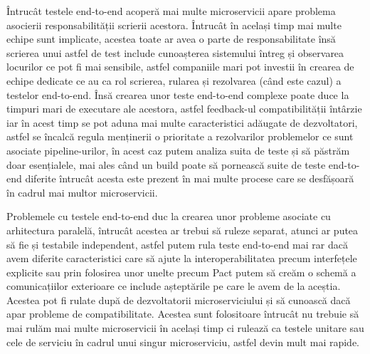 Întrucât testele end-to-end acoperă mai multe microservicii apare problema asocierii 
responsabilității scrierii acestora. Întrucât în același timp mai multe echipe sunt implicate,
acestea toate ar avea o parte de responsabilitate însă scrierea unui astfel de test 
include cunoașterea sistemului întreg și observarea locurilor ce pot fi mai sensibile,
astfel companiile mari pot investii în crearea de echipe dedicate ce au ca rol scrierea, 
rularea și rezolvarea (când este cazul) a testelor end-to-end. Însă crearea unor teste
end-to-end complexe poate duce la timpuri mari de executare ale acestora, astfel 
feedback-ul compatibilității întârzie iar în acest timp se pot aduna mai multe caracteristici
adăugate de dezvoltatori, astfel se încalcă regula menținerii o prioritate a rezolvarilor
problemelor ce sunt asociate pipeline-urilor, în acest caz putem analiza suita de teste și să
păstrăm doar esențialele, mai ales când un build poate să pornească suite de teste end-to-end diferite
întrucât acesta este prezent în mai multe procese care se desfășoară în cadrul mai multor
microservicii.

Problemele cu testele end-to-end duc la crearea unor probleme asociate cu arhitectura paralelă,
întrucât acestea ar trebui să ruleze separat, atunci ar putea să fie și testabile independent,
astfel putem rula teste end-to-end mai rar dacă avem diferite caracteristici care să 
ajute la interoperabilitatea precum interfețele explicite sau prin folosirea unor unelte precum Pact 
putem să creăm o schemă a comunicațiilor exterioare ce include așteptările pe care le avem de la 
aceștia. Acestea pot fi rulate după de dezvoltatorii microserviciului și să cunoască 
dacă apar probleme de compatibilitate. Acestea sunt folositoare întrucât nu trebuie să mai rulăm
mai multe microservicii în același timp ci rulează ca testele unitare sau cele de serviciu în cadrul
unui singur microserviciu, astfel devin mult mai rapide.

